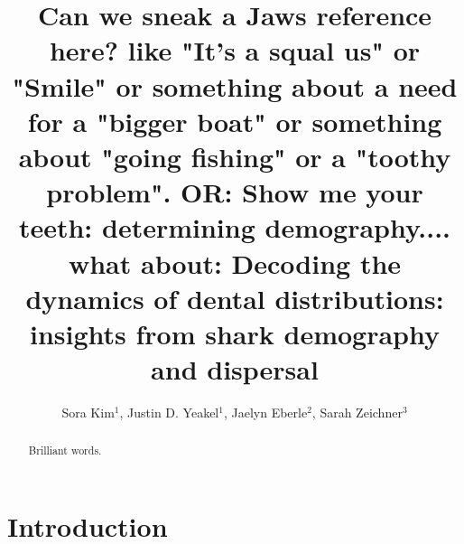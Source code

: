 \documentclass[]{rsos}%
\begin{document}
\title{Can we sneak a Jaws reference here? like "It's a squal us" or "Smile" or something about a need for a "bigger boat" or something about "going fishing" or a "toothy problem". OR: Show me your teeth: determining demography.... what about: Decoding the dynamics of dental distributions: insights from shark demography and dispersal}


\author{%
Sora Kim$^{1}$, Justin D. Yeakel$^{1}$, Jaelyn Eberle$^{2}$, Sarah Zeichner$^{3}$}

\address{$^{1}$School of Natural Science, University of California Merced,
$^{2}$Department of Geological Sciences and Museum of Natural History, University of Colorado,
$^{3}$Division of Geological and Planetary Sciences, California Institute of Technology}


\subject{paleontology, taphonomy, ecology, body size}



\begin{abstract}
Brilliant words.
\end{abstract}


\maketitle

\section{Introduction}
\end{document}
